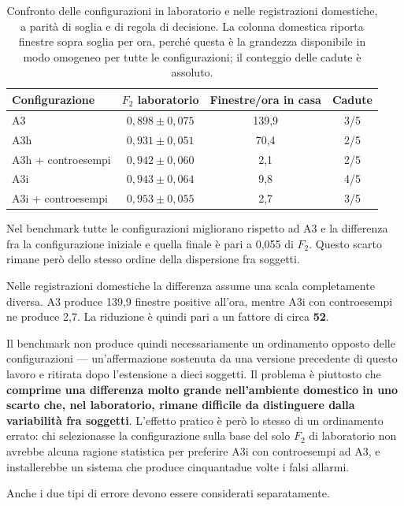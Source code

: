 \begin{table}[ht]
\centering
\caption{Confronto delle configurazioni in laboratorio e nelle registrazioni
domestiche, a parità di soglia e di regola di decisione. La colonna domestica
riporta finestre sopra soglia per ora, perché questa è la grandezza
disponibile in modo omogeneo per tutte le configurazioni; il conteggio delle
cadute è assoluto.}
\label{tab:configurazioni}
\begin{tabular}{lccc}
\toprule
\textbf{Configurazione} &
\textbf{$F_2$ laboratorio} &
\textbf{Finestre/ora in casa} &
\textbf{Cadute} \\
\midrule
A3 & $0{,}898\pm0{,}075$ & 139,9 & 3/5 \\
A3h & $0{,}931\pm0{,}051$ & 70,4 & 2/5 \\
A3h + controesempi & $0{,}942\pm0{,}060$ & 2,1 & 2/5 \\
A3i & $0{,}943\pm0{,}064$ & 9,8 & 4/5 \\
A3i + controesempi & $0{,}953\pm0{,}055$ & 2,7 & 3/5 \\
\bottomrule
\end{tabular}
\end{table}

Nel benchmark tutte le configurazioni migliorano rispetto ad A3 e la differenza fra la configurazione iniziale e quella finale è pari a 0,055 di $F_2$. Questo scarto rimane però dello stesso ordine della dispersione fra soggetti.

Nelle registrazioni domestiche la differenza assume una scala completamente diversa. A3 produce 139,9 finestre positive all'ora, mentre A3i con controesempi ne produce 2,7. La riduzione è quindi pari a un fattore di circa \textbf{52}.

Il benchmark non produce quindi necessariamente un ordinamento opposto delle configurazioni --- un'affermazione sostenuta da una versione precedente di questo lavoro e ritirata dopo l'estensione a dieci soggetti. Il problema è piuttosto che \textbf{comprime una differenza molto grande nell'ambiente domestico in uno scarto che, nel laboratorio, rimane difficile da distinguere dalla variabilità fra soggetti}. L'effetto pratico è però lo stesso di un ordinamento errato: chi selezionasse la configurazione sulla base del solo $F_2$ di laboratorio non avrebbe alcuna ragione statistica per preferire A3i con controesempi ad A3, e installerebbe un sistema che produce cinquantadue volte i falsi allarmi.

Anche i due tipi di errore devono essere considerati separatamente.

